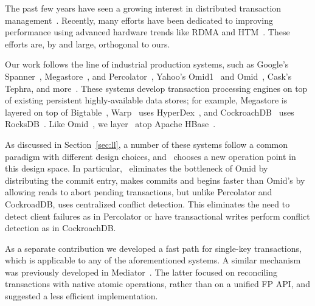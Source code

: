 

The past few years have seen a growing interest in distributed 
transaction management~\cite{PattersonENAA12,Cowling2012,Aguilera2015,Balakrishnan2013,Thomson2012,eyal2013ordering,Warp}.
Recently, many efforts have been dedicated to improving performance using advanced 
hardware trends like RDMA and HTM~\cite{Wei2015,Dragojevic2014,Dragojevic2015}.  
These efforts are, by and large, orthogonal to ours.

Our work follows the line of industrial production systems, such as 
Google's Spanner~\cite{Spanner2012}, Megastore~\cite{Megastore}, and Percolator~\cite{Percolator2010}, 
Yahoo's Omid1~\cite{OmidICDE2014} and Omid~\cite{Omid2017}, 
Cask's Tephra\cite{tephra}, and more~\cite{cockroach}.
These systems develop transaction processing engines on top of existing persistent 
highly-available data stores; for example, Megastore is layered on top of
Bigtable~\cite{Chang2008}, Warp~\cite{Warp} uses HyperDex~\cite{Escriva2012}, 
and CockroachDB~\cite{cockroach} uses RocksDB~\cite{rocksdb}.
Like  Omid~\cite{Omid2017}, we layer \sys\ atop Apache HBase~\cite{hbase}.

As discussed in Section~\ref{sec:ll}, a number of these systems follow a common paradigm
with different design choices, and \sys\ chooses a new operation point in 
this design space. In particular, \sys\ eliminates the bottleneck of Omid by
distributing the commit entry, makes commits and begins faster than Omid's by 
allowing reads to abort pending transactions, but unlike Percolator and CockroadDB, 
uses centralized conflict detection. This eliminates the need to detect client 
failures as in Percolator or have transactional writes perform conflict detection 
as in CockroachDB. 

As a separate contribution we developed a fast path for single-key transactions,
which is applicable to any of the aforementioned systems. A similar mechanism 
was previously developed in Mediator~\cite{mediator}. The latter focused on reconciling 
transactions with native atomic operations, rather than on a unified FP API, and suggested
a less efficient implementation.  

